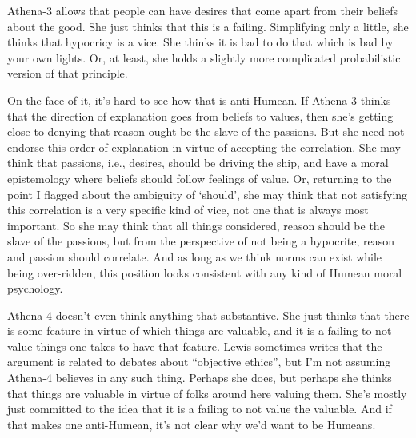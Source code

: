 \documentclass[11pt,]{book}
\begin{document}
Athena-3 allows that people can have desires that come apart from their beliefs about the good. She just thinks that this is a failing. Simplifying only a little, she thinks that hypocricy is a vice. She thinks it is bad to do that which is bad by your own lights. Or, at least, she holds a slightly more complicated probabilistic version of that principle.

On the face of it, it's hard to see how that is anti-Humean. If Athena-3 thinks that the direction of explanation goes from beliefs to values, then she's getting close to denying that reason ought be the slave of the passions. But she need not endorse this order of explanation in virtue of accepting the correlation. She may think that passions, i.e., desires, should be driving the ship, and have a moral epistemology where beliefs should follow feelings of value. Or, returning to the point I flagged about the ambiguity of `should', she may think that not satisfying this correlation is a very specific kind of vice, not one that is always most important. So she may think that all things considered, reason should be the slave of the passions, but from the perspective of not being a hypocrite, reason and passion should correlate. And as long as we think norms can exist while being over-ridden, this position looks consistent with any kind of Humean moral psychology.

Athena-4 doesn't even think anything that substantive. She just thinks that there is some feature in virtue of which things are valuable, and it is a failing to not value things one takes to have that feature. Lewis sometimes writes that the argument is related to debates about ``objective ethics'', but I'm not assuming Athena-4 believes in any such thing. Perhaps she does, but perhaps she thinks that things are valuable in virtue of folks around here valuing them. She's mostly just committed to the idea that it is a failing to not value the valuable. And if that makes one anti-Humean, it's not clear why we'd want to be Humeans.
\end{document}
